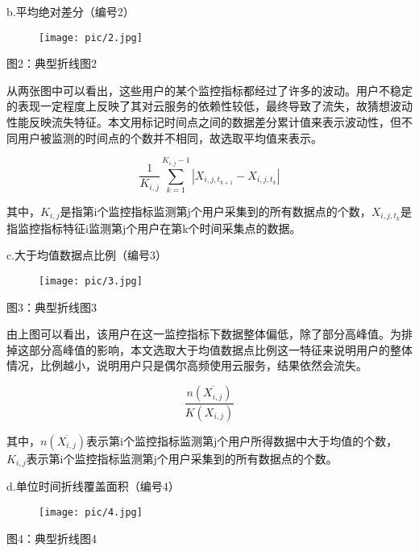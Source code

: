 \documentclass{ctexart}
\begin{document}
    b.平均绝对差分（编号2）

    \begin{center}
        \begin{figure}[H]
            \begin{center}
                \texttt{[image: pic/2.jpg]}
            \end{center}
        \end{figure}
        图2：典型折线图2
    \end{center}

    从两张图中可以看出，这些用户的某个监控指标都经过了许多的波动。用户不稳定的表现一定程度上反映了其对云服务的依赖性较低，最终导致了流失，故猜想波动性能反映流失特征。本文用标记时间点之间的数据差分累计值来表示波动性，但不同用户被监测的时间点的个数并不相同，故选取平均值来表示。

    \[
        \frac{1}{K_{i,j}}\sum_{k=1}^{K_{i,j}-1}{|X_{i,j,t_{k+1}}-X_{i,j,t_k}|}
    \]

    其中，$K_{i,j}$是指第i个监控指标监测第j个用户采集到的所有数据点的个数，$X_{i,j,t_k}$是指监控指标特征i监测第j个用户在第k个时间采集点的数据。

    c.大于均值数据点比例（编号3）

    \begin{center}
        \begin{figure}[H]
            \begin{center}
                \texttt{[image: pic/3.jpg]}
            \end{center}
        \end{figure}
        图3：典型折线图3
    \end{center}

    由上图可以看出，该用户在这一监控指标下数据整体偏低，除了部分高峰值。为排掉这部分高峰值的影响，本文选取大于均值数据点比例这一特征来说明用户的整体情况，比例越小，说明用户只是偶尔高频使用云服务，结果依然会流失。

    \[
        \frac{n(\overline{X_{i,j}})}{K(X_{i,j})}
    \]

    其中，$n(\overline{X_{i,j}})$表示第i个监控指标监测第j个用户所得数据中大于均值的个数，$K_{i,j}$表示第i个监控指标监测第j个用户采集到的所有数据点的个数。

    d.单位时间折线覆盖面积（编号4）

    \begin{center}
        \begin{figure}[H]
            \begin{center}
                \texttt{[image: pic/4.jpg]}
            \end{center}
        \end{figure}
        图4：典型折线图4
    \end{center}
\end{document}
